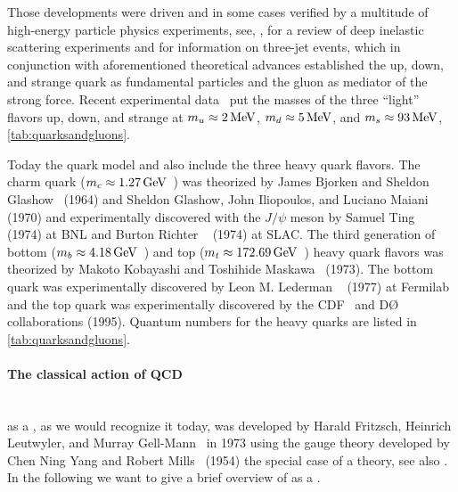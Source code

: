Those developments were driven and in some cases verified by a multitude of high-energy particle physics experiments, see, \eg{},  for a review of deep inelastic scattering experiments and  for information on three-jet events, which in conjunction with aforementioned theoretical advances established the up, down, and strange quark as fundamental particles and the gluon as mediator of the strong force.
Recent experimental data~\cite{ParticleDataGroup2022Aug} put the masses of the three ``light'' flavors up, down, and strange at $m_u\approx2\,\mathrm{MeV}$, $m_d\approx 5\,\mathrm{MeV}$, and $m_s\approx 93\, \mathrm{MeV}$, \cf{} \cref{tab:quarksandgluons}.

Today the quark model and \qcd{} also include the three heavy quark flavors.
The charm quark ($m_c\approx 1.27\, \mathrm{GeV}$~\cite{ParticleDataGroup2022Aug}) was theorized by James Bjorken and Sheldon Glashow~\cite{Bjorken1964Aug} (1964) and Sheldon Glashow, John Iliopoulos, and Luciano Maiani~\cite{Glashow1970Oct} (1970) and experimentally discovered with the $J/\psi$ meson by Samuel Ting \etal{}~\cite{Aubert1974Dec} (1974) at BNL and Burton Richter \etal{}~\cite{Augustin1974Dec} (1974) at SLAC.
The third generation of bottom ($m_b\approx 4.18\, \mathrm{GeV}$~\cite{ParticleDataGroup2022Aug}) and top ($m_t\approx 172.69\, \mathrm{GeV}$~\cite{ParticleDataGroup2022Aug}) heavy quark flavors was theorized by Makoto Kobayashi and Toshihide Maskawa~\cite{Kobayashi1973Feb} (1973).
The bottom quark was experimentally discovered by Leon M. Lederman \etal{}~\cite{Herb1977Aug} (1977) at Fermilab and the top quark was experimentally discovered by the CDF~\cite{CDFCollaboration1995Apr} and D\O{}~\cite{D0Collaboration1995Apr} collaborations (1995).
Quantum numbers for the heavy quarks are listed in \cref{tab:quarksandgluons}.

\paragraph{The classical action of QCD}\label{paragraph:qcdS}\mbox{}\\%
\qcd{} as a \qft{}, as we would recognize it today, was developed by Harald Fritzsch, Heinrich Leutwyler, and Murray Gell-Mann~\cite{Fritzsch1973Nov} in 1973 using the gauge theory developed by Chen Ning Yang and Robert Mills~\cite{Yang:1954ek} (1954) \dash{} the special case of a  \ym{} theory, see also .
In the following we want to give a brief overview of \qcd{} as a \qft{}.\bigskip

